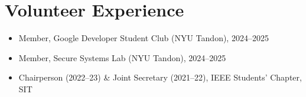 \documentclass[letterpaper,10pt]{article}
\newcommand{\resumeItem}[1]{
  \item\small{
    {#1 \vspace{-2pt}}
  }
}
\newcommand{\resumeSubItem}[1]{\resumeItem{#1}\vspace{-4pt}}
\newcommand{\resumeSubHeadingListStart}{\begin{itemize}[leftmargin=0.15in, label={}]}
\newcommand{\resumeSubHeadingListEnd}{\end{itemize}}
\begin{document}
\section{Volunteer Experience}
  \resumeSubHeadingListStart
    \resumeSubItem{Member, Google Developer Student Club (NYU Tandon), 2024--2025}
    \resumeSubItem{Member, Secure Systems Lab (NYU Tandon), 2024--2025}
    \resumeSubItem{Chairperson (2022--23) \& Joint Secretary (2021--22), IEEE Students’ Chapter, SIT}
  \resumeSubHeadingListEnd
\end{document}
